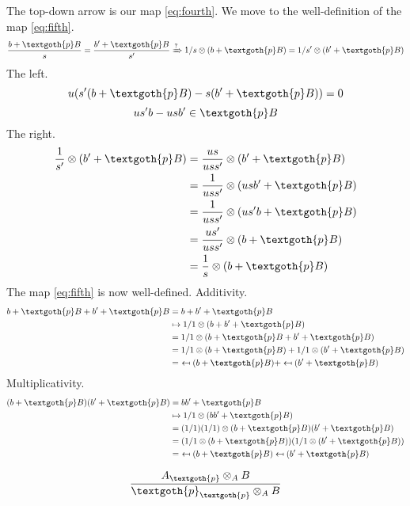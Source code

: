 \documentclass{article}
\begin{document}
\noindent
The top-down arrow is our map \eqref{eq:fourth}. We move to the well-definition of the map \eqref{eq:fifth}.
\[
\frac{b + \textgoth{p}B}{s} = \frac{b' + \textgoth{p}B}{s'} 
\xRightarrow{?}
1/s \otimes (b + \textgoth{p}B) = 1/s' \otimes (b' + \textgoth{p}B)
\]
The left.
\[
u(s'(b + \textgoth{p}B) - s(b' + \textgoth{p}B)) = 0
\]
\[
us'b - usb' \in \textgoth{p}B
\]
The right.
\begin{align*}
\frac{1}{s'} \otimes (b' + \textgoth{p}B) 
& = \frac{us}{uss'} \otimes (b' + \textgoth{p}B) \\
& = \frac{1}{uss'} \otimes (usb' + \textgoth{p}B) \\
& = \frac{1}{uss'} \otimes (us'b + \textgoth{p}B) \\
& = \frac{us'}{uss'} \otimes (b + \textgoth{p}B) \\
& = \frac{1}{s} \otimes (b + \textgoth{p}B)
\end{align*}
The map \eqref{eq:fifth} is now well-defined. Additivity.
\begin{align*}
b + \textgoth{p}B + b' + \textgoth{p}B & = b + b' + \textgoth{p}B \\
& \mapsto 1/1 \otimes (b + b' + \textgoth{p}B) \\
& = 1/1 \otimes (b + \textgoth{p}B + b' + \textgoth{p}B) \\
& = 1/1 \otimes (b + \textgoth{p}B) + 1/1 \otimes (b' + \textgoth{p}B) \\
& = \ \mapsfrom (b + \textgoth{p}B) + \mapsfrom (b' + \textgoth{p}B)
\end{align*}
Multiplicativity.
\begin{align*}
(b + \textgoth{p}B)(b' + \textgoth{p}B) & = bb' + \textgoth{p}B \\
& \mapsto 1/1 \otimes (bb' + \textgoth{p}B) \\
& = (1/1)(1/1) \otimes (b + \textgoth{p}B)(b' + \textgoth{p}B) \\
& = (1/1 \otimes (b + \textgoth{p}B))(1/1 \otimes (b' + \textgoth{p}B)) \\
& = \ \mapsfrom (b + \textgoth{p}B) \mapsfrom (b' + \textgoth{p}B) 
\end{align*}

\[
\frac{ A_\textgoth{p} \otimes_A B }{ \textgoth{p}_\textgoth{p} \otimes_A B }
\]
\end{document}
